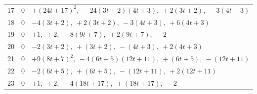 {\begin{longtable}{@{}rcp{}@{}}
17 & 0 & $+\left(24 t + 17\right)^{2},\ -24 \left(3 t + 2\right) \left(4 t + 3\right),\ +2 \left(3 t + 2\right),\ -3 \left(4 t + 3\right)$ \\
18 & 0 & $-4 \left(3 t + 2\right),\ +2 \left(3 t + 2\right),\ -3 \left(4 t + 3\right),\ +6 \left(4 t + 3\right)$ \\
19 & 0 & $+1,\ +2,\ -8 \left(9 t + 7\right),\ +2 \left(9 t + 7\right),\ -2$ \\
20 & 0 & $-2 \left(3 t + 2\right),\ +\left(3 t + 2\right),\ -\left(4 t + 3\right),\ +2 \left(4 t + 3\right)$ \\
21 & 0 & $+9 \left(8 t + 7\right)^{2},\ -4 \left(6 t + 5\right) \left(12 t + 11\right),\ +\left(6 t + 5\right),\ -\left(12 t + 11\right)$ \\
22 & 0 & $-2 \left(6 t + 5\right),\ +\left(6 t + 5\right),\ -\left(12 t + 11\right),\ +2 \left(12 t + 11\right)$ \\
23 & 0 & $+1,\ +2,\ -4 \left(18 t + 17\right),\ +\left(18 t + 17\right),\ -2$ \\
\bottomrule\end{longtable}}
